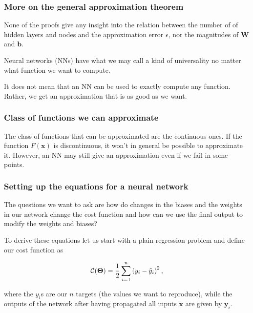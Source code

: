 \documentclass{beamer}
\begin{document}
\begin{frame}
\frametitle{More on the general approximation theorem}

None of the proofs give any insight into the relation between the
number of of hidden layers and nodes and the approximation error
$\epsilon$, nor the magnitudes of $\bm{W}$ and $\bm{b}$.

Neural networks (NNs) have what we may call a kind of universality no matter what function we want to compute.

\begin{block}{}
It does not mean that an NN can be used to exactly compute any function. Rather, we get an approximation that is as good as we want. 
\end{block}
\end{frame}

\begin{frame}
\frametitle{Class of functions we can approximate}

\begin{block}{}
The class of functions that can be approximated are the continuous ones.
If the function $F(\bm{x})$ is discontinuous, it won't in general be possible to approximate it. However, an NN may still give an approximation even if we fail in some points.
\end{block}
\end{frame}

\begin{frame}
\frametitle{Setting up the equations for a neural network}

The questions we want to ask are how do changes in the biases and the
weights in our network change the cost function and how can we use the
final output to modify the weights and biases?

To derive these equations let us start with a plain regression problem
and define our cost function as

\[
{\cal C}(\bm{\Theta})  =  \frac{1}{2}\sum_{i=1}^n\left(y_i - \tilde{y}_i\right)^2, 
\]

where the $y_i$s are our $n$ targets (the values we want to
reproduce), while the outputs of the network after having propagated
all inputs $\bm{x}$ are given by $\bm{\tilde{y}}_i$.
\end{frame}
\end{document}
